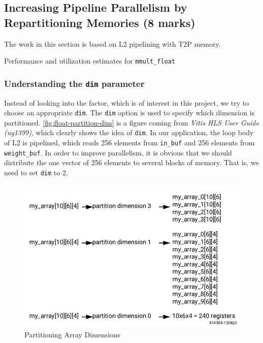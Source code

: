 \subsection{Increasing Pipeline Parallelism by Repartitioning Memories (8 marks)}

The work in this section is based on L2 pipelining with T2P memory.

\begin{table}
    \caption{Performance and utilization estimates for \texttt{mmult\_float}}\label{tab:float-summary}
    
\end{table}

\subsubsection{Understanding the \texttt{dim} parameter}\label{sec:1cDim}

Instead of looking into the factor, which is of interest in this project,
we try to choose an appropriate \texttt{dim}.
The \texttt{dim} option is used to specify which dimension is partitioned.
\autoref{fig:float-partition-dim} is a figure coming from \textit{Vitis HLS User Guide (ug1399)}, which clearly shows the idea of \texttt{dim}.
In our application, the loop body of L2 is pipelined, which reads 256 elements from \texttt{in\_buf} and 256 elements from \texttt{weight\_buf}.
In order to improve parallelism, it is obvious that we should distribute the one vector of 256 elements to several blocks of memory.
That is, we need to set \texttt{dim} to 2.

\begin{figure}[ht!]
    \centering
    \includegraphics[scale=0.5]{images/float-partition-dim.png}
    \caption{Partitioning Array Dimensions}
    \label{fig:float-partition-dim}
\end{figure}

